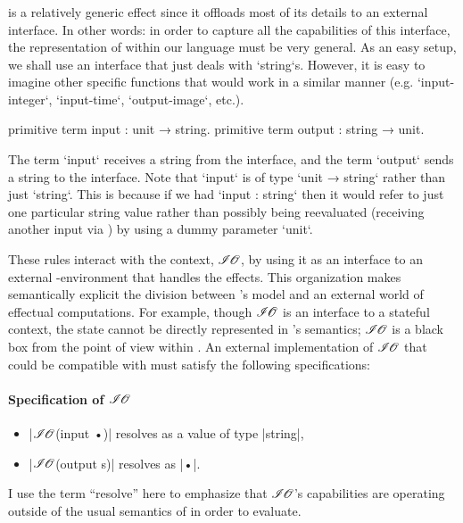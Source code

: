 \subsubsection{\IO}

\IO is a relatively generic effect since it offloads most of its details to an external interface.
In other words: in order to capture all the capabilities of this interface, the representation of \IO within our language must be very general.
As an easy setup, we shall use an \IO interface that just deals with \code`string`s.
However, it is easy to imagine other specific \IO functions that would work in a similar manner (e.g. \code`input-integer`, \code`input-time`, \code`output-image`, etc.).

\begin{program}[caption={Definitions for \IO}]
primitive term input  : unit   → string.
primitive term output : string → unit.
\end{program}

The term \code`input` receives a string from the \IO interface, and
the term \code`output` sends a string to the \IO interface.
Note that \code`input` is of type \code`unit → string` rather than just \code`string`.
This is because if we had \code`input : string` then it would refer to just one particular string value rather than possibly being reevaluated (receiving another input via \IO) by using a dummy parameter \code`unit`.



These rules interact with the \IO context, $\mathscr{I\hspace{-0.1em}O}$, by using it as an interface to an external \IO-environment that handles the \IO effects.
This organization makes semantically explicit the division between \LangB's model and an external world of effectual computations.
For example, though $\mathscr{I\hspace{-0.1em}O}$ is an interface to a stateful context, the state cannot be directly represented in \LangB's semantics; $\mathscr{I\hspace{-0.1em}O}$ is a black box from the point of view within \LangB.
An external implementation of $\mathscr{I\hspace{-0.1em}O}$ that could be compatible with \LangB must satisfy the following specifications:
%
\paragraph{Specification of $\mathscr{I\hspace{-0.1em}O}$}
\begin{itemize}
\item \code|$\mathscr{I\hspace{-0.1em}O}$(input •)| resolves as a value of type \code|string|,
\item \code|$\mathscr{I\hspace{-0.1em}O}$(output s)| resolves as \code|•|.
\end{itemize}
%
I use the term ``resolve'' here to emphasize that $\mathscr{I\hspace{-0.1em}O}$'s capabilities are operating outside of the usual semantics of \LangB in order to evaluate.

